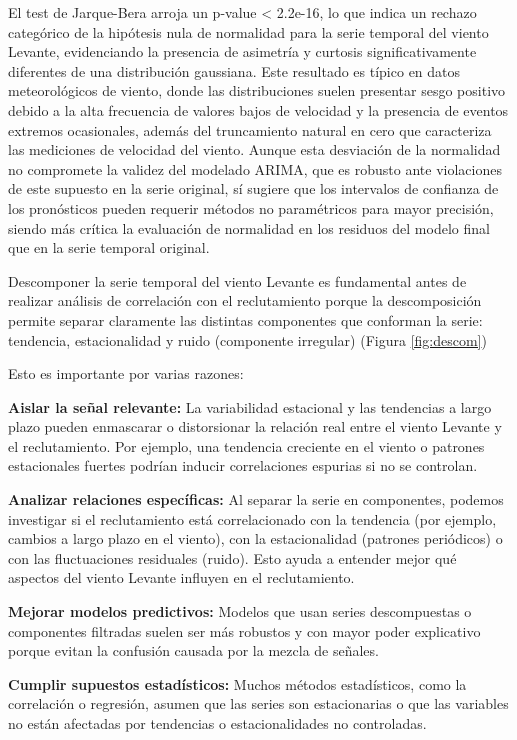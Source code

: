 \documentclass[
]{article}
\begin{document}
El test de Jarque-Bera arroja un p-value \textless{} 2.2e-16, lo que indica un rechazo categórico de la hipótesis nula de normalidad para la serie temporal del viento Levante, evidenciando la presencia de asimetría y curtosis significativamente diferentes de una distribución gaussiana. Este resultado es típico en datos meteorológicos de viento, donde las distribuciones suelen presentar sesgo positivo debido a la alta frecuencia de valores bajos de velocidad y la presencia de eventos extremos ocasionales, además del truncamiento natural en cero que caracteriza las mediciones de velocidad del viento. Aunque esta desviación de la normalidad no compromete la validez del modelado ARIMA, que es robusto ante violaciones de este supuesto en la serie original, sí sugiere que los intervalos de confianza de los pronósticos pueden requerir métodos no paramétricos para mayor precisión, siendo más crítica la evaluación de normalidad en los residuos del modelo final que en la serie temporal original.

Descomponer la serie temporal del viento Levante es fundamental antes de realizar análisis de correlación con el reclutamiento porque la descomposición permite separar claramente las distintas componentes que conforman la serie: tendencia, estacionalidad y ruido (componente irregular) (Figura \ref{fig:descom})

Esto es importante por varias razones:

\textbf{Aislar la señal relevante:} La variabilidad estacional y las tendencias a largo plazo pueden enmascarar o distorsionar la relación real entre el viento Levante y el reclutamiento. Por ejemplo, una tendencia creciente en el viento o patrones estacionales fuertes podrían inducir correlaciones espurias si no se controlan.

\textbf{Analizar relaciones específicas:} Al separar la serie en componentes, podemos investigar si el reclutamiento está correlacionado con la tendencia (por ejemplo, cambios a largo plazo en el viento), con la estacionalidad (patrones periódicos) o con las fluctuaciones residuales (ruido). Esto ayuda a entender mejor qué aspectos del viento Levante influyen en el reclutamiento.

\textbf{Mejorar modelos predictivos:} Modelos que usan series descompuestas o componentes filtradas suelen ser más robustos y con mayor poder explicativo porque evitan la confusión causada por la mezcla de señales.

\textbf{Cumplir supuestos estadísticos:} Muchos métodos estadísticos, como la correlación o regresión, asumen que las series son estacionarias o que las variables no están afectadas por tendencias o estacionalidades no controladas.
\end{document}
